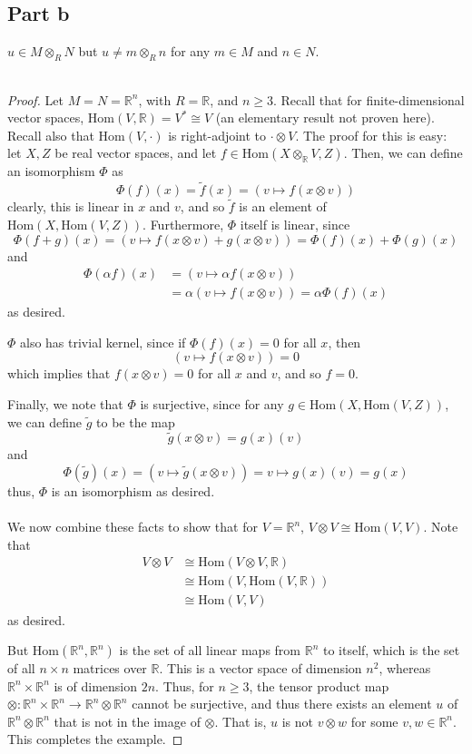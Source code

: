 \documentclass[12pt,reqno]{amsart}
\newcommand{\R}{\mathbb{R}}
\newcommand{\Hom}{\textrm{Hom}}
\begin{document}
\subsection*{Part b}
$u\in M\otimes_R N$ but $u\neq m\otimes_R n $ for any $m\in M$ and $n\in N$.
\\
\\
\begin{proof}
    Let $M=N=\R^n$, with $R=\R$, and $n\geq 3$. Recall that for
    finite-dimensional vector spaces, $\Hom(V,\R)=V^*\cong V$ (an elementary
    result not proven here). Recall also that
    $\Hom(V,\cdot)$ is right-adjoint to $\cdot\otimes V$. The proof for this is
    easy: let $X,Z$ be real vector spaces, and let $f\in\Hom(X\otimes_{\R}V,Z)$.
    Then, we can define an isomorphism $\Phi$ as
    \[
        \Phi(f)(x) = \tilde{f}(x) = (v\mapsto f(x\otimes v))
    \]
    clearly, this is linear in $x$ and $v$, and so $\tilde{f}$ is an element of
    $\Hom(X,\Hom(V,Z))$. Furthermore, $\Phi$ itself is linear, since
    \[
        \Phi(f+g)(x) = (v\mapsto f(x\otimes v)+g(x\otimes v)) =
        \Phi(f)(x)+\Phi(g)(x)
    \]
    and
    \[
        \begin{aligned}
        \Phi(\alpha f)(x) &= (v\mapsto \alpha f(x\otimes v))\\
        &=\alpha (v\mapsto f(x\otimes v)) = \alpha\Phi(f)(x)
    \end{aligned}
    \]
    as desired.

    $\Phi$ also has trivial kernel, since if $\Phi(f)(x) = 0$ for all $x$, then
    \[
        (v\mapsto f(x\otimes v)) = 0
    \]
    which implies that $f(x\otimes v)=0$ for all $x$ and $v$, and so $f=0$.

    Finally, we note that $\Phi$ is surjective, since for any
    $g\in\Hom(X,\Hom(V,Z))$, we can define $\tilde{g}$ to be the map
    \[
        \tilde{g}(x\otimes v) = g(x)(v)
    \]
    and 
    \[
        \Phi(\tilde{g})(x) = (v\mapsto \tilde{g}(x\otimes v)) = v\mapsto
    g(x)(v) = g(x)
    \]
    thus, $\Phi$ is an isomorphism as desired.
    \\
    \\
    We now combine these facts to show that for $V=\R^n$, $V\otimes
    V\cong\Hom(V,V)$. Note that
    \[
        \begin{aligned}
        V\otimes V &\cong \Hom(V\otimes V,\R)\\
        &\cong \Hom(V,\Hom(V,\R))\\
        &\cong \Hom(V,V)
    \end{aligned}
    \]
    as desired.

    But $\Hom(\R^n,\R^n)$ is the set of all linear maps from $\R^n$ to itself,
    which is the set of all $n\times n$ matrices over $\R$. This is a vector
    space of dimension $n^2$, whereas $\R^n\times \R^n$ is of dimension $2n$.
    Thus, for $n\geq 3$, the tensor product map $\otimes:
    \R^n\times\R^n\to\R^n\otimes \R^n$ cannot be surjective, and thus there
    exists an element $u$ of $\R^n\otimes \R^n$ that is not in the image of
    $\otimes$. That is, $u$ is not $v\otimes w$ for some $v,w\in \R^n$. This
    completes the example.
\end{proof}
\end{document}
